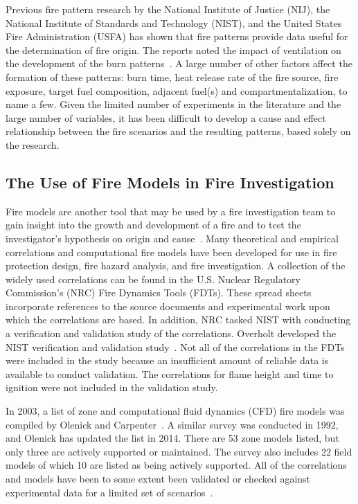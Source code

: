 \documentclass[twoside]{uocthesis}
\begin{document}
Previous fire pattern research by the National Institute of Justice (NIJ), the National Institute of Standards and Technology (NIST), and the United States Fire Administration (USFA) has shown that fire patterns provide data useful for the determination of fire origin.  The reports noted the impact of ventilation on the development of the burn patterns~\cite{Shanley:1997,Putorti:1997}. A large number of other factors affect the formation of these patterns: burn time, heat release rate of the fire source, fire exposure, target fuel composition, adjacent fuel(s) and compartmentalization, to name a few. Given the limited number of experiments in the literature and the large number of variables, it has been difficult to develop a cause and effect relationship between the fire scenarios and the resulting patterns, based solely on the research.  


\subsection{The Use of Fire Models in Fire Investigation}
Fire models are another tool that may be used by a fire investigation team to gain insight into the growth and development of a fire and to test the investigator’s hypothesis on origin and cause~\cite{Sutula:2001}.  Many theoretical and empirical correlations and computational fire models have been developed for use in fire protection design, fire hazard analysis, and fire investigation.  A collection of the widely used correlations can be found in the U.S. Nuclear Regulatory Commission’s (NRC) Fire Dynamics Tools (FDTs). These spread sheets incorporate references to the source documents and experimental work upon which the correlations are based. In addition, NRC tasked NIST with conducting a verification and validation study of the correlations. Overholt developed the NIST verification and validation study~\cite{Overholt:2014}. Not all of the correlations in the FDTs were included in the study because an insufficient amount of reliable data is available to conduct validation.  The correlations for flame height and time to ignition were not included in the validation study.

In 2003, a list of zone and computational fluid dynamics (CFD) fire models was compiled by Olenick and Carpenter~\cite{Olenick:2003}. A similar survey was conducted in 1992, and Olenick has updated the list in 2014. There are 53 zone models listed, but only three are actively supported or maintained.  The survey also includes 22 field models of which 10 are listed as being actively supported.  All of the correlations and models have been to some extent been validated or checked against experimental data for a limited set of scenarios~\cite{ASTM_E1355}.
\end{document}
